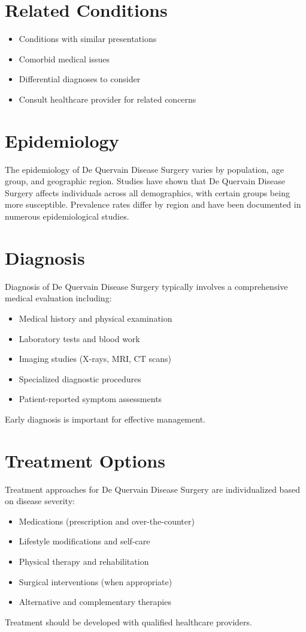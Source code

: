 \section*{Related Conditions}
\begin{itemize}
  \item Conditions with similar presentations
  \item Comorbid medical issues
  \item Differential diagnoses to consider
  \item Consult healthcare provider for related concerns
\end{itemize}

\section*{Epidemiology}
The epidemiology of De Quervain Disease Surgery varies by population, age group, and geographic region. Studies have shown that De Quervain Disease Surgery affects individuals across all demographics, with certain groups being more susceptible. Prevalence rates differ by region and have been documented in numerous epidemiological studies.

\section*{Diagnosis}
Diagnosis of De Quervain Disease Surgery typically involves a comprehensive medical evaluation including:
\begin{itemize}
  \item Medical history and physical examination
  \item Laboratory tests and blood work
  \item Imaging studies (X-rays, MRI, CT scans)
  \item Specialized diagnostic procedures
  \item Patient-reported symptom assessments
\end{itemize}
Early diagnosis is important for effective management.

\section*{Treatment Options}
Treatment approaches for De Quervain Disease Surgery are individualized based on disease severity:
\begin{itemize}
  \item Medications (prescription and over-the-counter)
  \item Lifestyle modifications and self-care
  \item Physical therapy and rehabilitation
  \item Surgical interventions (when appropriate)
  \item Alternative and complementary therapies
\end{itemize}
Treatment should be developed with qualified healthcare providers.

